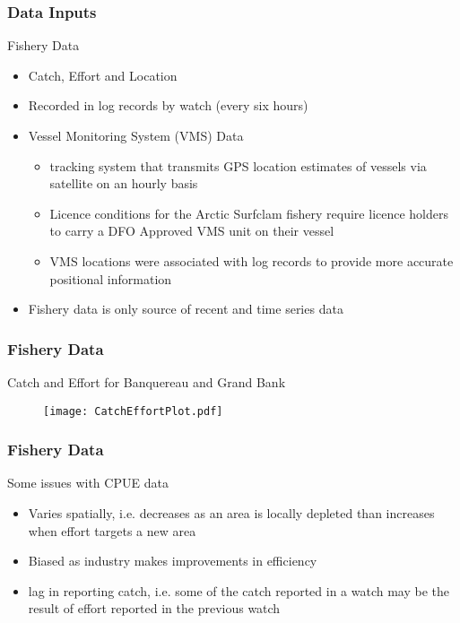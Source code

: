 \documentclass{beamer}
\begin{document}
\begin{frame}
\frametitle{Data Inputs}
Fishery Data
\begin{itemize}
\item Catch, Effort and Location 
\item Recorded in log records by watch (every six hours)
\item Vessel Monitoring System (VMS) Data
\begin{itemize}
\item tracking system that transmits GPS location estimates of vessels via satellite on an hourly basis
\item Licence conditions for the Arctic Surfclam fishery require licence holders to carry a DFO Approved VMS unit on their vessel
\item VMS locations were associated with log records to provide more accurate positional information 
\end{itemize}
\item Fishery data is only source of recent and time series data
\end{itemize}

\end{frame}


\begin{frame}
\frametitle{Fishery Data}
Catch and Effort for Banquereau and Grand Bank

\begin{figure}
        \begin{center}
            \texttt{[image: CatchEffortPlot.pdf]}
        \end{center}
    \end{figure}


\end{frame}

%
\begin{frame}
\frametitle{Fishery Data}
Some issues with CPUE data

\begin{itemize}
    \item Varies spatially, i.e. decreases as an area is locally depleted than increases when effort targets a new area
    \item Biased as industry makes improvements in efficiency
    \item lag in reporting catch, i.e. some of the catch reported in a watch may be the result of effort reported in the previous watch
\end{itemize}


\end{frame}
\end{document}
